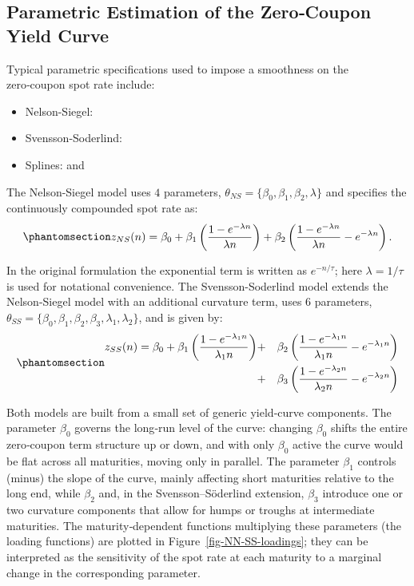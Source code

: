 \documentclass[
  letterpaper,
  DIV=11,
  numbers=noendperiod]{scrreprt}
\providecommand{\tightlist}{%
  \setlength{\itemsep}{0pt}\setlength{\parskip}{0pt}}
\begin{document}
\subsection{Parametric Estimation of the Zero‑Coupon Yield
Curve}\label{parametric-estimation-of-the-zerocoupon-yield-curve}

Typical parametric specifications used to impose a smoothness on the
zero‑coupon spot rate include:

\begin{itemize}
\tightlist
\item
  Nelson-Siegel:
\item
  Svensson-Soderlind:
\item
  Splines: and
\end{itemize}

The Nelson-Siegel model uses \(4\) parameters,
\(\theta_{NS}=\{ \beta_0, \beta_1, \beta_2, \lambda\}\) and specifies
the continuously compounded spot rate as:
\begin{equation}\protect\phantomsection\label{eq-gen-0036}{  
\begin{align}
    z_{NS}(n) = \beta_0 + \beta_1 \left(\frac{1-e^{-\lambda n}}{\lambda n}\right) + \beta_2 \left(\frac{1-e^{-\lambda n}}{\lambda n} - e^{-\lambda n}\right).
\end{align}
}\end{equation}

In the original formulation the exponential term is written as
\(e^{-n/\tau}\); here \(\lambda = 1/\tau\) is used for notational
convenience. The Svensson-Soderlind model extends the Nelson-Siegel
model with an additional curvature term, uses \(6\) parameters,
\(\theta_{SS}=\{ \beta_0, \beta_1, \beta_2, \beta_3, \lambda_1, \lambda_2\}\),
and is given by:
\begin{equation}\protect\phantomsection\label{eq-gen-0037}{ 
\begin{align}
    z_{SS}(n) = \beta_0 + \beta_1 \left(\frac{1-e^{-\lambda_1 n}}{\lambda_1 n}\right) &+& \beta_2 \left(\frac{1-e^{-\lambda_1 n}}{\lambda_1 n} - e^{-\lambda_1 n}\right) \nonumber \\
    &+& \beta_3 \left(\frac{1-e^{-\lambda_2 n}}{\lambda_2 n} - e^{-\lambda_2 n}\right)
\end{align}
}\end{equation}

Both models are built from a small set of generic yield‑curve
components. The parameter \(\beta_0\) governs the long‑run level of the
curve: changing \(\beta_0\) shifts the entire zero‑coupon term structure
up or down, and with only \(\beta_0\) active the curve would be flat
across all maturities, moving only in parallel. The parameter
\(\beta_1\) controls (minus) the slope of the curve, mainly affecting
short maturities relative to the long end, while \(\beta_2\) and, in the
Svensson--Söderlind extension, \(\beta_3\) introduce one or two
curvature components that allow for humps or troughs at intermediate
maturities. The maturity‑dependent functions multiplying these
parameters (the loading functions) are plotted in
Figure~\ref{fig-NN-SS-loadings}; they can be interpreted as the
sensitivity of the spot rate at each maturity to a marginal change in
the corresponding parameter.
\end{document}
